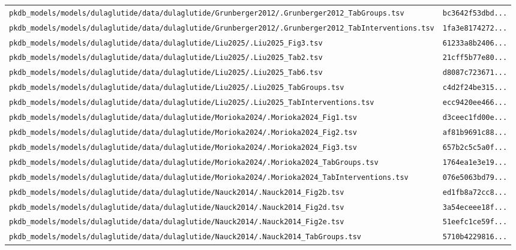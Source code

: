 \begin{longtable}{ll}
\texttt{pkdb\_models/models/dulaglutide/data/dulaglutide/Grunberger2012/.Grunberger2012\_TabGroups.tsv} & \texttt{bc3642f53dbd...} \\
\texttt{pkdb\_models/models/dulaglutide/data/dulaglutide/Grunberger2012/.Grunberger2012\_TabInterventions.tsv} & \texttt{1fa3e8174272...} \\
\texttt{pkdb\_models/models/dulaglutide/data/dulaglutide/Liu2025/.Liu2025\_Fig3.tsv} & \texttt{61233a8b2406...} \\
\texttt{pkdb\_models/models/dulaglutide/data/dulaglutide/Liu2025/.Liu2025\_Tab2.tsv} & \texttt{21cff5b77e80...} \\
\texttt{pkdb\_models/models/dulaglutide/data/dulaglutide/Liu2025/.Liu2025\_Tab6.tsv} & \texttt{d8087c723671...} \\
\texttt{pkdb\_models/models/dulaglutide/data/dulaglutide/Liu2025/.Liu2025\_TabGroups.tsv} & \texttt{c4d2f24be315...} \\
\texttt{pkdb\_models/models/dulaglutide/data/dulaglutide/Liu2025/.Liu2025\_TabInterventions.tsv} & \texttt{ecc9420ee466...} \\
\texttt{pkdb\_models/models/dulaglutide/data/dulaglutide/Morioka2024/.Morioka2024\_Fig1.tsv} & \texttt{d3ceec1fd00e...} \\
\texttt{pkdb\_models/models/dulaglutide/data/dulaglutide/Morioka2024/.Morioka2024\_Fig2.tsv} & \texttt{af81b9691c88...} \\
\texttt{pkdb\_models/models/dulaglutide/data/dulaglutide/Morioka2024/.Morioka2024\_Fig3.tsv} & \texttt{657b2c5c5a0f...} \\
\texttt{pkdb\_models/models/dulaglutide/data/dulaglutide/Morioka2024/.Morioka2024\_TabGroups.tsv} & \texttt{1764ea1e3e19...} \\
\texttt{pkdb\_models/models/dulaglutide/data/dulaglutide/Morioka2024/.Morioka2024\_TabInterventions.tsv} & \texttt{076e5063bd79...} \\
\texttt{pkdb\_models/models/dulaglutide/data/dulaglutide/Nauck2014/.Nauck2014\_Fig2b.tsv} & \texttt{ed1fb8a72cc8...} \\
\texttt{pkdb\_models/models/dulaglutide/data/dulaglutide/Nauck2014/.Nauck2014\_Fig2d.tsv} & \texttt{3a54eceee18f...} \\
\texttt{pkdb\_models/models/dulaglutide/data/dulaglutide/Nauck2014/.Nauck2014\_Fig2e.tsv} & \texttt{51eefc1ce59f...} \\
\texttt{pkdb\_models/models/dulaglutide/data/dulaglutide/Nauck2014/.Nauck2014\_TabGroups.tsv} & \texttt{5710b4229816...} \\

\end{longtable}
